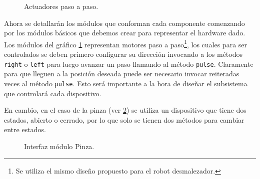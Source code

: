 \begin{figure}[h]
\caption{Actuadores paso a paso.}
\label{estructuraActuadores}
\begin{center}
\end{center}
\end{figure}
Ahora se detallarán los módulos que conforman cada componente comenzando por los módulos básicos que debemos crear para representar el hardware dado. Los módulos del gráfico \ref{estructuraActuadores} representan motores paso a paso\footnote{Se utiliza el mismo diseño propuesto para el robot desmalezador\cite{paperPomponio}.}, los cuales para ser controlados se deben primero configurar su dirección invocando a los métodos \verb|right| o \verb|left| para luego avanzar un paso llamando al método \verb|pulse|. Claramente para que lleguen a la posición deseada puede ser necesario invocar reiteradas veces al método \verb|pulse|. Esto será importante a la hora de diseñar el subsistema que controlará cada dispositivo.

En cambio, en el caso de la pinza (ver \ref{moduloPinza}) se utiliza un dispositivo que tiene dos estados, abierto o cerrado, por lo que solo se tienen dos métodos para cambiar entre estados.

\begin{figure}[h!]
\caption{Interfaz módulo Pinza.}
\label{moduloPinza}
\begin{center}
\end{center}
\end{figure}

